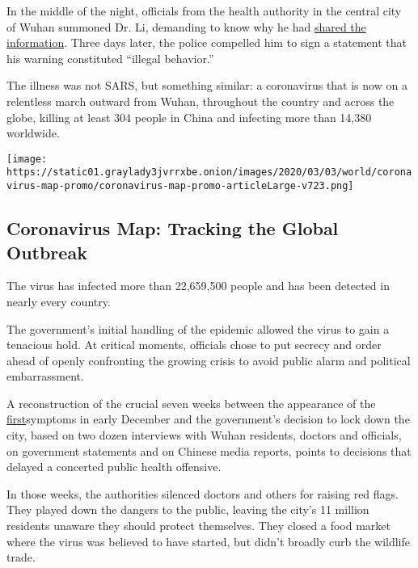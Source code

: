 In the middle of the night, officials from the health authority in the
central city of Wuhan summoned Dr. Li, demanding to know why he had
\href{https://www.nytimes3xbfgragh.onion/2020/01/27/technology/china-coronavirus-censorship-social-media.html}{shared
the information}. Three days later, the police compelled him to sign a
statement that his warning constituted ``illegal behavior.''

The illness was not SARS, but something similar: a coronavirus that is
now on a relentless march outward from Wuhan, throughout the country and
across the globe, killing at least 304 people in China and infecting
more than 14,380 worldwide.

\href{https://www.nytimes3xbfgragh.onion/interactive/2020/world/coronavirus-maps.html}{}

\texttt{[image: https://static01.graylady3jvrrxbe.onion/images/2020/03/03/world/coronavirus-map-promo/coronavirus-map-promo-articleLarge-v723.png]}

\hypertarget{coronavirus-map-tracking-the-global-outbreak}{%
\subsection{Coronavirus Map: Tracking the Global
Outbreak}\label{coronavirus-map-tracking-the-global-outbreak}}

The virus has infected more than 22,659,500 people and has been detected
in nearly every country.

The government's initial handling of the epidemic allowed the virus to
gain a tenacious hold. At critical moments, officials chose to put
secrecy and order ahead of openly confronting the growing crisis to
avoid public alarm and political embarrassment.

A reconstruction of the crucial seven weeks between the appearance of
the
\href{https://www.thelancet.com/journals/lancet/article/PIIS0140-6736(20)30183-5/fulltext}{first}symptoms
in early December and the government's decision to lock down the city,
based on two dozen interviews with Wuhan residents, doctors and
officials, on government statements and on Chinese media reports, points
to decisions that delayed a concerted public health offensive.

In those weeks, the authorities silenced doctors and others for raising
red flags. They played down the dangers to the public, leaving the
city's 11 million residents unaware they should protect themselves. They
closed a food market where the virus was believed to have started, but
didn't broadly curb the wildlife trade.

